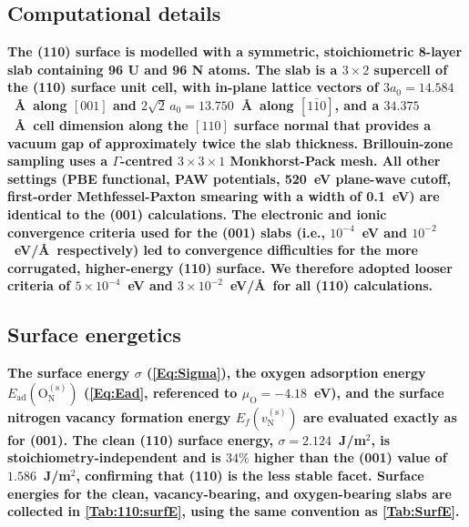 \documentclass[preprint,12pt,sort&compress]{elsarticle}
\newcommand{\?}{\stackrel{?}{=}}
\providecommand{\DIFaddtex}[1]{{\bf #1}} %
\providecommand{\DIFadd}[1]{\texorpdfstring{\DIFaddtex{#1}}{#1}} %
\begin{document}
\subsection{\DIFadd{Computational details}}
\label{App:110:comp}

\DIFadd{The (110) surface is modelled with a symmetric, stoichiometric 8-layer slab containing 96 U and 96 N atoms. The slab is a $3\times2$ supercell of the (110) surface unit cell, with in-plane lattice vectors of $3a_0=14.584$~\AA\ along $[001]$ and $2\sqrt{2}\,a_0=13.750$~\AA\ along $[1\bar{1}0]$, and a $34.375$~\AA\ cell dimension along the $[110]$ surface normal that provides a vacuum gap of approximately twice the slab thickness. Brillouin-zone sampling uses a $\Gamma$-centred $3\times3\times1$ Monkhorst-Pack mesh. All other settings (PBE functional, PAW potentials, 520~eV plane-wave cutoff, first-order Methfessel-Paxton smearing with a width of 0.1~eV) are identical to the (001) calculations. The electronic and ionic convergence criteria used for the (001) slabs (i.e., $10^{-4}$~eV and $10^{-2}$~eV/\AA\ respectively) led to convergence difficulties for the more corrugated, higher-energy (110) surface. We therefore adopted looser criteria of $5\times10^{-4}$~eV and $3\times10^{-2}$~eV/\AA\ for all (110) calculations.
}

\subsection{\DIFadd{Surface energetics}}
\label{App:110:energetics}

\DIFadd{The surface energy $\sigma$ (\cref{Eq:Sigma}), the oxygen adsorption energy $E_\text{ad}(\text{O}_\text{N}^{(\text{s})})$ (\cref{Eq:Ead}, referenced to $\mu_\text{O}=-4.18$~eV), and the surface nitrogen vacancy formation energy $E_f(v_\text{N}^{(\text{s})})$ are evaluated exactly as for (001). The clean (110) surface energy, $\sigma=2.124$~J/m$^2$, is stoichiometry-independent and is $34\%$ higher than the (001) value of $1.586$~J/m$^2$, confirming that (110) is the less stable facet. Surface energies for the clean, vacancy-bearing, and oxygen-bearing slabs are collected in \cref{Tab:110:surfE}, using the same convention as \cref{Tab:SurfE}.
}
\end{document}
